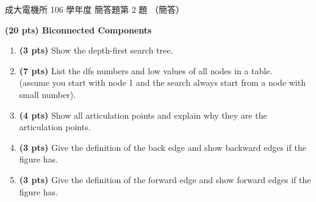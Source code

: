 \begin{pastexam}[label={px:ncku-106-ee-ds-06}]{成大電機所 106 學年度 簡答題第 2 題}
（簡答）

\textbf{(20 pts) Biconnected Components}

\begin{center}
\end{center}
\begin{enumerate}[label=\alph*.]
\item \textbf{(3 pts)} Show the depth-first search tree.
\item \textbf{(7 pts)} List the dfs numbers and low values of all nodes in a table.\\
(assume you start with node 1 and the search always start from a node with small number).
\item \textbf{(4 pts)} Show all articulation points and explain why they are the articulation points.
\item \textbf{(3 pts)} Give the definition of the back edge and show backward edges if the figure has.
\item \textbf{(3 pts)} Give the definition of the forward edge and show forward edges if the figure has.
\end{enumerate}
\end{pastexam}

